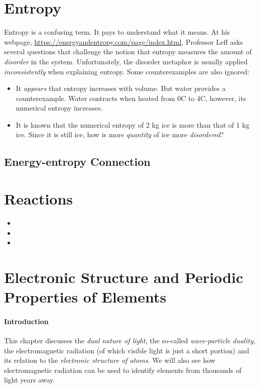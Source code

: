 \documentclass{article}
\begin{document}
{\section{Entropy}
Entropy is a confusing term. It pays to understand what it means.
At his webpage, \url{https://energyandentropy.com/page/index.html}, Professor Leff asks several questions that challenge the notion that entropy measures the amount of \textit{disorder} in the system. Unfortunately, the disorder metaphor is usually applied \textit{inconsistently} when explaining entropy. Some counterexamples are also ignored:
\begin{itemize}
    \item It \textit{appears} that entropy increases with volume. But water provides a counterexample. Water contracts when heated from 0\degree C to 4\degree C, however, its numerical entropy increases.
    \item It is known that the numerical entropy of 2 kg ice is more than that of 1 kg ice. Since it is still ice, how is more \textit{quantity} of ice more \textit{disordered}?
\end{itemize}

\subsection{Energy-entropy Connection}

\section{Reactions}
\begin{itemize}
    \item {}
    \item {}
    \item {}
\end{itemize}

\section{Electronic Structure and Periodic Properties of Elements}
\paragraph{Introduction}
This chapter discusses the \emph{dual nature of light}, the so-called \emph{wave-particle duality}, the electromagnetic radiation (of which visible light is just a short portion) and its relation to the \emph{electronic structure of atoms}. We will also see how electromagnetic radiation can be used to identify elements from thousands of light years away.

}
\end{document}
